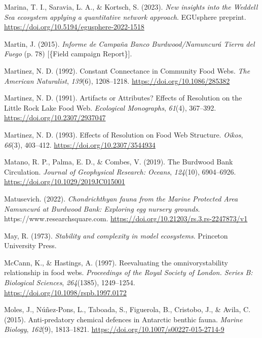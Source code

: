 \documentclass[preprint, 3p,
authoryear]{elsarticle} %
\newlength{\cslhangindent}
\newlength{\cslentryspacingunit} %
\newenvironment{CSLReferences}[2] %
 {%
  \setlength{\parindent}{0pt}
  \ifodd #1
  \let\oldpar\par
  \def\par{\hangindent=\cslhangindent\oldpar}
  \fi
  \setlength{\parskip}{#2\cslentryspacingunit}
 }%
 {}
\begin{document}
\begin{CSLReferences}{1}{0}
\leavevmode{}%
Marina, T. I., Saravia, L. A., \& Kortsch, S. (2023). \emph{New insights
into the {Weddell Sea} ecosystem applying a quantitative network
approach}. {EGUsphere preprint}.
\url{https://doi.org/10.5194/egusphere-2022-1518}

\leavevmode{}%
Martin, J. (2015). \emph{{Informe de Campaña Banco Burdwood/Namuncurá
\textendash{} Tierra del Fuego}} (p. 78) {[}\{Field campaign
Report\}{]}.

\leavevmode{}%
Martinez, N. D. (1992). Constant {Connectance} in {Community Food Webs}.
\emph{The American Naturalist}, \emph{139}(6), 1208--1218.
\url{https://doi.org/10.1086/285382}

\leavevmode{}%
Martinez, N. D. (1991). Artifacts or {Attributes}? {Effects} of
{Resolution} on the {Little Rock Lake Food Web}. \emph{Ecological
Monographs}, \emph{61}(4), 367--392.
\url{https://doi.org/10.2307/2937047}

\leavevmode{}%
Martinez, N. D. (1993). Effects of {Resolution} on {Food Web Structure}.
\emph{Oikos}, \emph{66}(3), 403--412.
\url{https://doi.org/10.2307/3544934}

\leavevmode{}%
Matano, R. P., Palma, E. D., \& Combes, V. (2019). The {Burdwood Bank
Circulation}. \emph{Journal of Geophysical Research: Oceans},
\emph{124}(10), 6904--6926. \url{https://doi.org/10.1029/2019JC015001}

\leavevmode{}%
Matusevich. (2022). \emph{Chondrichthyan fauna from the {Marine
Protected Area Namuncurá} at {Burdwood Bank}: Exploring egg nursery
grounds}. https://www.researchsquare.com.
\url{https://doi.org/10.21203/rs.3.rs-2247873/v1}

\leavevmode{}%
May, R. (1973). \emph{Stability and complexity in model ecosystems}.
{Princeton University Press}.

\leavevmode{}%
McCann, K., \& Hastings, A. (1997). Re\textendash evaluating the
omnivory\textendash stability relationship in food webs.
\emph{Proceedings of the Royal Society of London. Series B: Biological
Sciences}, \emph{264}(1385), 1249--1254.
\url{https://doi.org/10.1098/rspb.1997.0172}

\leavevmode{}%
Moles, J., Núñez-Pons, L., Taboada, S., Figuerola, B., Cristobo, J., \&
Avila, C. (2015). Anti-predatory chemical defences in {Antarctic}
benthic fauna. \emph{Marine Biology}, \emph{162}(9), 1813--1821.
\url{https://doi.org/10.1007/s00227-015-2714-9}


\end{CSLReferences}
\end{document}
